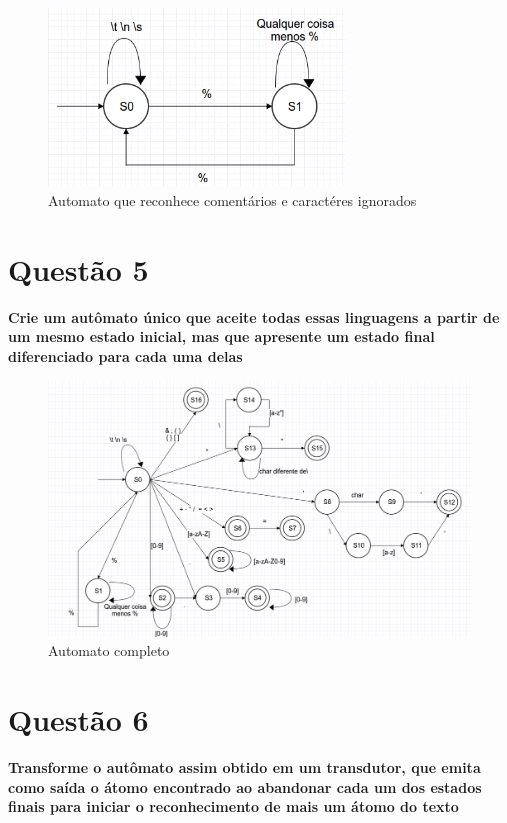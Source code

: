 \begin{figure}[H]
  \caption{Automato que reconhece comentários e caractéres ignorados}
  \centering
    \includegraphics[width=0.7\textwidth]{../0-lexico/automatos/non-used}
\end{figure}

\section{Questão 5}

\textbf{Crie um autômato único que aceite todas essas linguagens a partir de um mesmo estado inicial, mas que apresente um estado final diferenciado para cada uma delas}

\begin{figure}[H]
  \caption{Automato completo}
  \centering
    \includegraphics[width=\textwidth]{../0-lexico/automatos/completo}
\end{figure}

\section{Questão 6}

\textbf{Transforme o autômato assim obtido em um transdutor, que emita como saída o átomo encontrado ao abandonar cada um dos estados finais para iniciar o reconhecimento de mais um átomo do texto}

